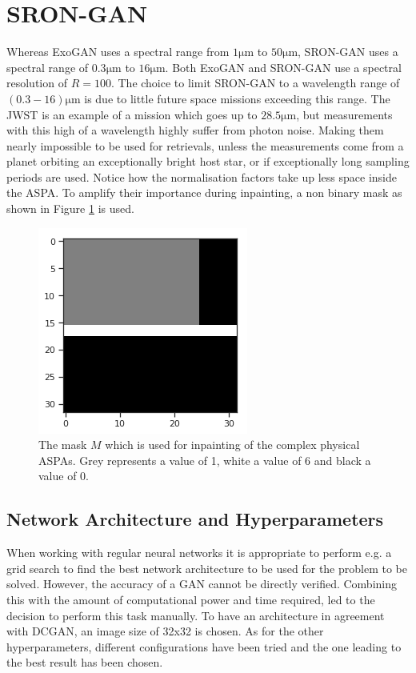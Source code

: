 \section{SRON-GAN}
Whereas ExoGAN uses a spectral range from $1 \mathrm{ \mu m}$ to $50 \mathrm{ \mu m}$, SRON-GAN uses a spectral range of $0.3 \mathrm{ \mu m}$ to $ 16 \mathrm{ \mu m}$. Both ExoGAN and SRON-GAN use a spectral resolution of $R=100$. The choice to limit SRON-GAN to a wavelength range of $(0.3-16) \mathrm{ \mu m}$ is due to little future space missions exceeding this range. The JWST is an example of a mission which goes up to $28.5 \mathrm{ \mu m}$, but measurements with this high of a wavelength highly suffer from photon noise. Making them nearly impossible to be used for retrievals, unless the measurements come from a planet orbiting an exceptionally bright host star, or if exceptionally long sampling periods are used. Notice how the normalisation factors take up less space inside the ASPA. To amplify their importance during inpainting, a non binary mask as shown in Figure \ref{fig:exogan_mask} is used. 


\begin{figure} [!htb]
    \centering
    \includegraphics[scale=0.6]{figuren/exogan mask.png}
    \caption{The mask $M$ which is used for inpainting of the complex physical ASPAs. Grey represents a value of 1, white a value of 6 and black a value of 0.}
    \label{fig:exogan_mask}
\end{figure}



\subsection{Network Architecture and Hyperparameters}
When working with regular neural networks it is appropriate to perform e.g. a grid search to find the best network architecture to be used for the problem to be solved. However, the accuracy of a GAN cannot be directly verified. Combining this with the amount of computational power and time required, led to the decision to perform this task manually. To have an architecture in agreement with DCGAN, an image size of 32x32 is chosen. As for the other hyperparameters, different configurations have been tried and the one leading to the best result has been chosen. 

